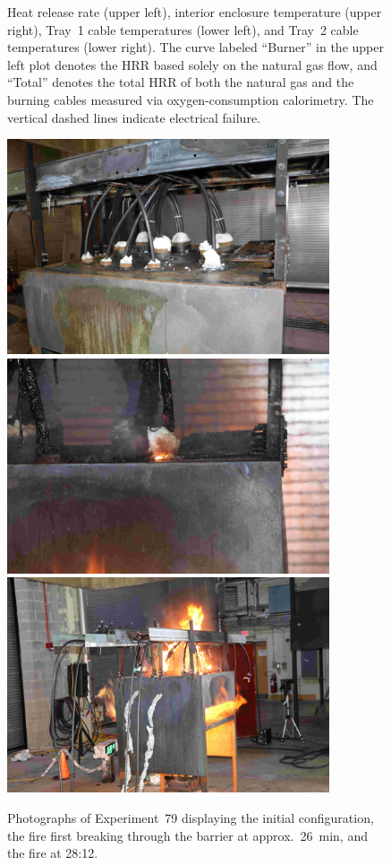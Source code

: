 \begin{figure}[H]
\caption[HRR and temperatures of Experiment 79]{Heat release rate (upper left), interior enclosure temperature (upper right), Tray~1 cable temperatures (lower left), and Tray~2 cable temperatures (lower right). The curve labeled ``Burner'' in the upper left plot denotes the HRR based solely on the natural gas flow, and ``Total'' denotes the total HRR of both the natural gas and the burning cables measured via oxygen-consumption calorimetry. The vertical dashed lines indicate electrical failure.}
\label{fig:Test_79}
\end{figure}

\begin{figure}[p]
\centering
\includegraphics[height=2.50in]{../FIGURES/Test_79_Photo_1} \\ \vspace{0.1in}
\includegraphics[height=2.50in]{../FIGURES/Test_79_Photo_2} \\ \vspace{0.1in}
\includegraphics[height=2.50in]{../FIGURES/Test_79_Photo_3}
\caption[Photographs of Experiment~79]{Photographs of Experiment~79 displaying the initial configuration, the fire first breaking through the barrier at approx.~26~min, and the fire at 28:12.}
\label{fig:Test_79_photos}
\end{figure}


